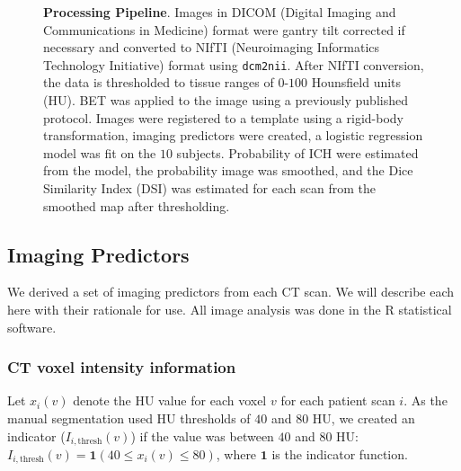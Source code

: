 \documentclass[12pt]{report}
\begin{document}
\begin{refsection}
\begin{figure}
\caption{{\bf Processing Pipeline}.  Images in DICOM (Digital Imaging and Communications in Medicine) format were gantry tilt corrected if necessary and converted to NIfTI (Neuroimaging Informatics Technology Initiative) format using \texttt{dcm2nii}.  After NIfTI conversion, the data is thresholded to tissue ranges of $0$-$100$ Hounsfield units (HU).  BET was applied to the image using a previously published protocol.  Images were registered to a template using a rigid-body transformation, imaging predictors were created, a logistic regression model was fit on the $10$ subjects.  Probability of ICH were estimated from the model, the probability image was smoothed, and the Dice Similarity Index (DSI) was estimated for each scan from the smoothed map after thresholding.   }
\label{fig:framework}
\end{figure}



\subsection{Imaging Predictors}
We derived a set of imaging predictors from each CT scan.  We will describe each here with their rationale for use.  All image analysis was done in the R statistical software.


\subsubsection{CT voxel intensity information} Let $x_{i}(v)$ denote the  HU value for each voxel $v$ for each patient scan $i$. As the manual segmentation used HU thresholds of $40$ and $80$ HU, we created an indicator ($I_{i,\text{thresh}}(v)$) if the value was between $40$ and $80$ HU: $I_{i,\text{thresh}}(v) = \mathbf{1}(40 \leq x_{i}(v) \leq 80)$, where $\mathbf{1}$ is the indicator function.


\end{refsection}
\end{document}
